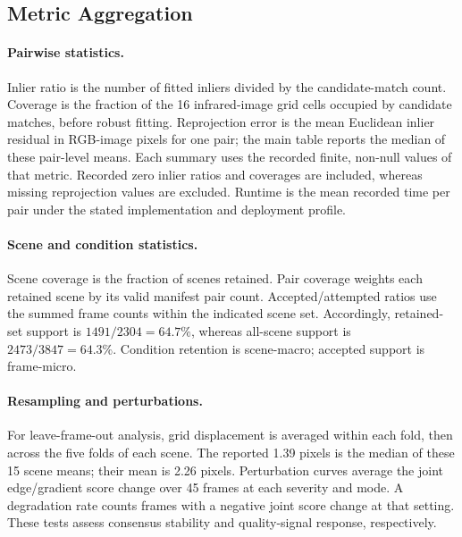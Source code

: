 \subsection{Metric Aggregation}
\label{sec:metric_aggregation}

\paragraph{Pairwise statistics.}
Inlier ratio is the number of fitted inliers divided by the candidate-match count. Coverage is
the fraction of the 16 infrared-image grid cells occupied by candidate matches, before robust
fitting. Reprojection error is the mean Euclidean inlier residual in RGB-image pixels for one
pair; the main table reports the median of these pair-level means. Each summary uses the recorded
finite, non-null values of that metric. Recorded zero inlier ratios and coverages are included,
whereas missing reprojection values are excluded. Runtime is the mean recorded time per pair
under the stated implementation and deployment profile.

\paragraph{Scene and condition statistics.}
Scene coverage is the fraction of scenes retained. Pair coverage weights each retained scene by
its valid manifest pair count. Accepted/attempted ratios use the summed frame counts within the
indicated scene set. Accordingly, retained-set support is $1491/2304=64.7\%$, whereas all-scene
support is $2473/3847=64.3\%$. Condition retention is scene-macro; accepted support is frame-micro.

\paragraph{Resampling and perturbations.}
For leave-frame-out analysis, grid displacement is averaged within each fold, then across the
five folds of each scene. The reported 1.39 pixels is the median of these 15 scene means;
their mean is 2.26 pixels. Perturbation curves average the joint edge/gradient score change
over 45 frames at each severity and mode. A degradation rate counts frames with a negative joint
score change at that setting. These tests assess consensus stability and quality-signal response,
respectively.
